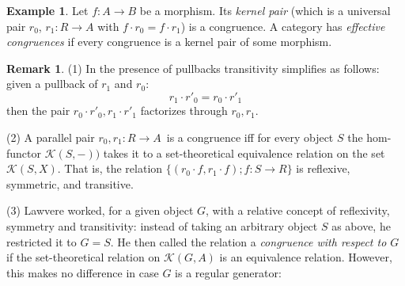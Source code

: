 \documentclass[12pt,amstex,leqno]{amsart}
\newcommand\ck{\mathcal {K}}
\theoremstyle{definition}
\newtheorem{example}[theorem]{Example}
\newtheorem{remark}[theorem]{Remark}
\numberwithin{equation}{section}
\begin{document}
\begin{example}
Let $f\colon A\to B$ be a morphism. Its \emph{kernel pair} (which is a universal pair $r_0$, $r_1\colon R\to A$ with $f\cdot r_0 = f\cdot r_1$) is a congruence. A  category has \emph{effective congruences} if every congruence is a kernel pair of some morphism.
\end{example}

\begin{remark}
(1) In the presence of pullbacks transitivity simplifies as follows: given a pullback of $r_1$ and $r_0$:
$$r_1 \cdot r'_0 = r_0 \cdot r'_1$$
then the pair $r_0 \cdot r'_0 , r_1 \cdot r'_1$ factorizes through $r_0 , r_1$. 


(2) A parallel pair  $r_0, r_1\colon R\to A\,$ is a congruence iff for every object $S$
the hom-functor $\ck (S,-))$ takes it to a set-theoretical equivalence relation on the set
$\ck (S,X)$. That is, the relation $ \{(r_0 \cdot f, r_1 \cdot f); f \colon S \to R\}$ is reflexive, symmetric, and transitive.

(3) Lawvere worked, for a given object $G$, with a relative concept of reflexivity, symmetry and transitivity: instead of taking an arbitrary object $S$ as above, he restricted it to $G=S$. He then called the relation a \emph{congruence with respect to $G$} if the  set-theoretical relation on $\ck (G,A)$  is an equivalence relation. However, this makes no difference in case $G$ is a regular generator:

\end{remark}
\end{document}
